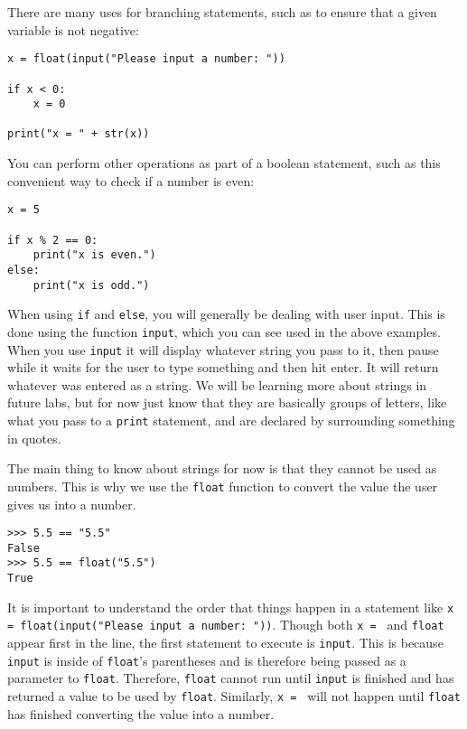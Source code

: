 \documentclass[12pt,hidelinks]{article}
\begin{document}
There are many uses for branching statements, such as to ensure that a given variable is not negative:

\begin{lstlisting}[style=python]
x = float(input("Please input a number: "))

if x < 0:
    x = 0

print("x = " + str(x))
\end{lstlisting}

You can perform other operations as part of a boolean statement, such as this convenient way to check if a number is even:

\begin{lstlisting}[style=python]
x = 5

if x % 2 == 0:
    print("x is even.")
else:
    print("x is odd.")
\end{lstlisting}

When using \texttt{if} and \texttt{else}, you will generally be dealing with user input. This is done using the function \texttt{input}, which you can see used in the above examples. When you use \texttt{input} it will display whatever string you pass to it, then pause while it waits for the user to type something and then hit enter. It will return whatever was entered as a string. We will be learning more about strings in future labs, but for now just know that they are basically groups of letters, like what you pass to a \texttt{print} statement, and are declared by surrounding something in quotes.

The main thing to know about strings for now is that they cannot be used as numbers. This is why we use the \texttt{float} function to convert the value the user gives us into a number.

\begin{lstlisting}[style=python]
>>> 5.5 == "5.5"
False
>>> 5.5 == float("5.5")
True
\end{lstlisting}

It is important to understand the order that things happen in a statement like \texttt{x = float(input("Please input a number: "))}. Though both \texttt{x = } and \texttt{float} appear first in the line, the first statement to execute is \texttt{input}. This is because \texttt{input} is inside of \texttt{float}'s parentheses and is therefore being passed as a parameter to \texttt{float}. Therefore, \texttt{float} cannot run until \texttt{input} is finished and has returned a value to be used by \texttt{float}. Similarly, \texttt{x = } will not happen until \texttt{float} has finished converting the value into a number.
\end{document}
